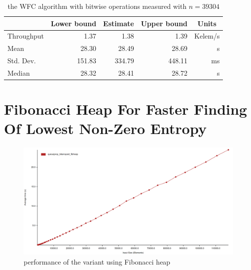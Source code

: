 \documentclass[shortabstract, english, inz]{iithesis}
\begin{document}
\begin{table}[]
\centering
\begin{tabular}{@{}l|r|r|r|r|@{}}
\cmidrule(l){2-5}
                                 & \multicolumn{1}{c|}{Lower bound} & \multicolumn{1}{c|}{Estimate} & \multicolumn{1}{c|}{Upper bound} & \multicolumn{1}{c|}{Units} \\ \midrule
\multicolumn{1}{|l|}{Throughput} & 1.37                             & 1.38                          & 1.39                             & Kelem/s                    \\ \midrule
\multicolumn{1}{|l|}{Mean}       & 28.30                            & 28.49                         & 28.69                            & s                          \\ \midrule
\multicolumn{1}{|l|}{Std. Dev.}  & 151.83                           & 334.79                        & 448.11                           & ms                         \\ \midrule
\multicolumn{1}{|l|}{Median}     & 28.32                            & 28.41                         & 28.72                            & s                          \\ \bottomrule
\end{tabular}
\caption{the WFC algorithm with bitwise operations measured with \(n = 39304\)}
\label{table:bitwise}
\end{table}



\section{Fibonacci Heap For Faster Finding Of Lowest Non-Zero Entropy}
\begin{figure}[H]
\centering
\includegraphics[width=1\textwidth, angle=0]{images/fibheap_performance.png}
\caption{performance of the variant using Fibonacci heap}
\label{fig:queue_bitarrayset_fibheap_performance}
\end{figure}
\label{fibheap}
\end{document}
